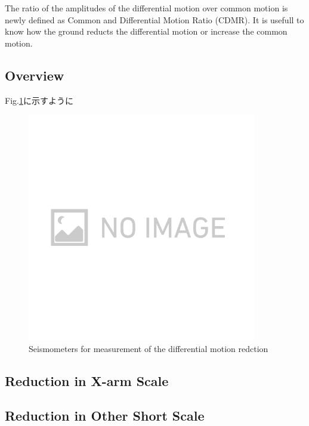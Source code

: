 The ratio of the amplitudes of the differential motion over common motion is newly defined as Common and Differential Motion Ratio (CDMR). It is usefull to know how the ground reducts the differential motion or increase the common motion. 

\subsection{Overview}
Fig.\ref{img:img318}に示すように

\begin{figure}[H]
  \begin{center}   
    \includegraphics[width=10.0cm]{./img_chap3/img318.png}
    \caption{Seismometers for measurement of the differential motion redction}\label{img:img318}
  \end{center}
\end{figure}


\subsection{Reduction in X-arm Scale}



\subsection{Reduction in Other Short Scale}

